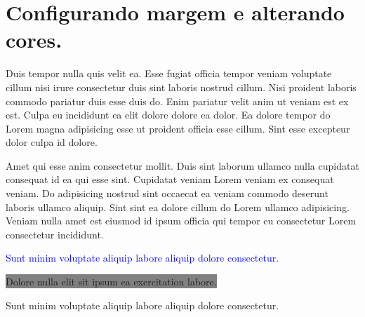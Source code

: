 \documentclass[12pt]{article} %
\begin{document}
\section*{Configurando margem e alterando cores.}

Duis tempor nulla quis velit ea. Esse fugiat officia tempor veniam voluptate cillum nisi irure consectetur duis sint laboris nostrud cillum. Nisi proident laboris commodo pariatur duis esse duis do. Enim pariatur velit anim ut veniam est ex est. Culpa eu incididunt ea elit dolore dolore ea dolor. Ea dolore tempor do Lorem magna adipisicing esse ut proident officia esse cillum. Sint esse excepteur dolor culpa id dolore.

Amet qui esse anim consectetur mollit. Duis sint laborum ullamco nulla cupidatat consequat id ea qui esse sint. Cupidatat veniam Lorem veniam ex consequat veniam. Do adipisicing nostrud sint occaecat ea veniam commodo deserunt laboris ullamco aliquip. Sint sint ea dolore cillum do Lorem ullamco adipisicing. Veniam nulla amet est eiusmod id ipsum officia qui tempor eu consectetur Lorem consectetur incididunt.

\textcolor{blue}{Sunt minim voluptate aliquip labore aliquip dolore consectetur.}

\colorbox{gray}{Dolore nulla elit sit ipsum ea exercitation labore.}

\textcolor{minhacor1}{Sunt minim voluptate aliquip labore aliquip dolore consectetur.}
\end{document}
